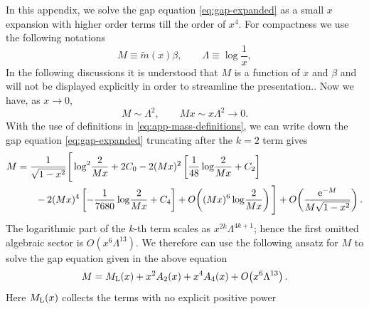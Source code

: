 \documentclass[a4paper,11pt]{article}
\newcommand{\e}{\mathrm e}
\begin{document}
In this appendix, we solve the gap equation \eqref{eq:gap-expanded} as a small $x$ expansion with higher order terms
till the order of $x^4$.  For compactness we use the following notations
\begin{equation}
	M\equiv\tilde m(x)\beta,
	\qquad
	\Lambda\equiv\log\!\frac1x ,
	\label{eq:app-mass-definitions}
\end{equation}
In the following discussions it is understood that $M$ is a function of $x$ and $\beta$ and will not be displayed explicitly in order to streamline the presentation.. Now we have, as $x\to0$,
\begin{equation}
	M\sim\Lambda^2,
	\qquad
	Mx\sim x\Lambda^2\longrightarrow0.
\end{equation}
With the use of  definitions in \eqref{eq:app-mass-definitions}, we can write down the gap equation \eqref{eq:gap-expanded}
 truncating
 after the $k=2$ term gives
\begin{align}
	M={}&\frac1{\sqrt{1-x^2}}
	\Bigg[
	\log^2\!\frac{2}{Mx}+2C_0
	-2(Mx)^2
	\left[
	\frac1{48}\log\!\frac{2}{Mx}+C_2
	\right]
	\nonumber\\
	&\hspace{2mm}
	-2(Mx)^4
	\left[
	-\frac1{7680}\log\!\frac{2}{Mx}+C_4
	\right]
	+O\!\left(
	(Mx)^6\log\!\frac{2}{Mx}
	\right)
	\Bigg]
+O\!\left(
	\frac{\e^{-M}}{M\sqrt{1-x^2}}
	\right).
	\label{eq:app-mass-gap-k2}
\end{align}
The logarithmic part of the $k$-th term scales as
$x^{2k}\Lambda^{4k+1}$; hence the first omitted algebraic sector is
$O(x^6\Lambda^{13})$.  We therefore can use the following ansatz for $M$ to solve the gap equation given in the above equation
\begin{equation}
	M
	=
	M_{\rm L}(x)
	+x^2A_2(x)
	+x^4A_4(x)
	+O\!\left(x^6\Lambda^{13}\right).
	\label{eq:app-mass-sector-ansatz}
\end{equation}
Here $M_{\rm L}(x)$ collects the terms with no explicit positive power
\end{document}
